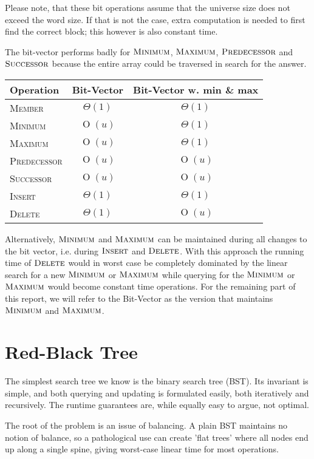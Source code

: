\documentclass[oneside,11pt,openright]{report}
\newcommand{\BigO}[1]{\ensuremath{\operatorname{O}\left(#1\right)}}
\newcommand{\BigT}[1]{\ensuremath{\Theta\left(#1\right)}}
\newcommand{\Insert}{\textsc{Insert}}
\newcommand{\Delete}{\textsc{Delete}}
\newcommand{\Member}{\textsc{Member}}
\newcommand{\Minimum}{\textsc{Minimum}}
\newcommand{\Maximum}{\textsc{Maximum}}
\newcommand{\Predecessor}{\textsc{Predecessor}}
\newcommand{\Successor}{\textsc{Successor}}
\begin{document}
Please note, that these bit operations assume that the universe size
does not exceed the word size. If that is not the case, extra
computation is needed to first find the correct block; this however is
also constant time.

The bit-vector performs badly for $\Minimum$, $\Maximum$,
$\Predecessor$ and $\Successor$ because the entire array could be
traversed in search for the answer.

\begin{center}
  \begin{tabular}{ l | c | c}
    Operation & Bit-Vector & Bit-Vector w. min \& max \\ \hline
    \Member & $\BigT{1}$ & $\BigT{1}$ \\ 
    \Minimum & $\BigO{u}$ & $\BigT{1}$ \\ 
    \Maximum & $\BigO{u}$ & $\BigT{1}$ \\ 
    \Predecessor & $\BigO{u}$ & $\BigO{u}$ \\ 
    \Successor & $\BigO{u}$ & $\BigO{u}$ \\ 
    \Insert & $\BigT{1}$ & $\BigT{1}$ \\ 
    \Delete & $\BigT{1}$ & $\BigO{u}$ \\
  \end{tabular}
\end{center}

Alternatively, $\Minimum$ and $\Maximum$ can be maintained during all
changes to the bit vector, i.e. during $\Insert$ and $\Delete$. With this
approach the running time of $\Delete$ would in worst case be completely
dominated by the linear search for a new $\Minimum$ or $\Maximum$ while
querying for the $\Minimum$ or $\Maximum$ would become constant time
operations. For the remaining part of this report, we will refer to the Bit-Vector as the version that maintains $\Minimum$ and $\Maximum$.

\chapter{Red-Black Tree}

The simplest search tree we know is the binary search tree (BST). Its
invariant is simple, and both querying and updating is formulated
easily, both iteratively and recursively. The runtime guarantees are,
while equally easy to argue, not optimal.

The root of the problem is an issue of balancing. A plain BST
maintains no notion of balance, so a pathological use can create 'flat
trees' where all nodes end up along a single spine, giving worst-case
linear time for most operations.
\end{document}
